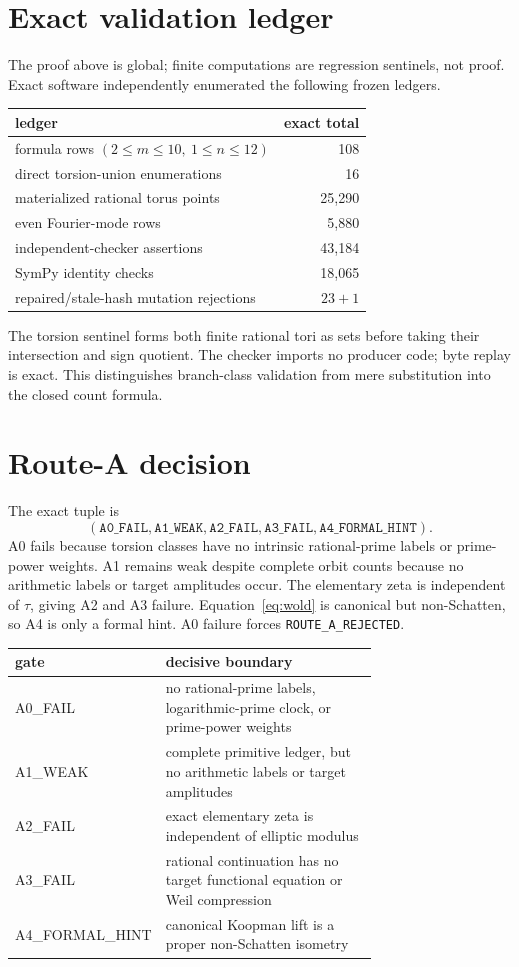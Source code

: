\documentclass[10pt]{article}
\begin{document}
\section{Exact validation ledger}
The proof above is global; finite computations are regression sentinels, not
proof.  Exact software independently enumerated the following frozen ledgers.
\begin{center}
\small
\begin{tabular}{@{}lr@{}}
\toprule
ledger & exact total\\
\midrule
formula rows $(2\le m\le10,\ 1\le n\le12)$ & 108\\
direct torsion-union enumerations & 16\\
materialized rational torus points & 25,290\\
even Fourier-mode rows & 5,880\\
independent-checker assertions & 43,184\\
SymPy identity checks & 18,065\\
repaired/stale-hash mutation rejections & $23+1$\\
\bottomrule
\end{tabular}
\end{center}
The torsion sentinel forms both finite rational tori as sets before taking
their intersection and sign quotient.  The checker imports no producer code;
byte replay is exact.  This distinguishes branch-class validation from mere
substitution into the closed count formula.

\section{Route-A decision}
The exact tuple is
\[
(\texttt{A0\_FAIL},\texttt{A1\_WEAK},\texttt{A2\_FAIL},
 \texttt{A3\_FAIL},\texttt{A4\_FORMAL\_HINT}).
\]
A0 fails because torsion classes have no intrinsic rational-prime labels or
prime-power weights.  A1 remains weak despite complete orbit counts because
no arithmetic labels or target amplitudes occur.  The elementary zeta is
independent of $\tau$, giving A2 and A3 failure.  Equation~\eqref{eq:wold}
is canonical but non-Schatten, so A4 is only a formal hint.  A0 failure forces
\texttt{ROUTE\_A\_REJECTED}.

\begin{center}
\small
\begin{tabular}{@{}>{\ttfamily}l p{0.72\linewidth}@{}}
\toprule
gate & decisive boundary\\
\midrule
A0\_FAIL & no rational-prime labels, logarithmic-prime clock, or prime-power weights\\
A1\_WEAK & complete primitive ledger, but no arithmetic labels or target amplitudes\\
A2\_FAIL & exact elementary zeta is independent of elliptic modulus\\
A3\_FAIL & rational continuation has no target functional equation or Weil compression\\
A4\_FORMAL\_HINT & canonical Koopman lift is a proper non-Schatten isometry\\
\bottomrule
\end{tabular}
\end{center}
\end{document}
